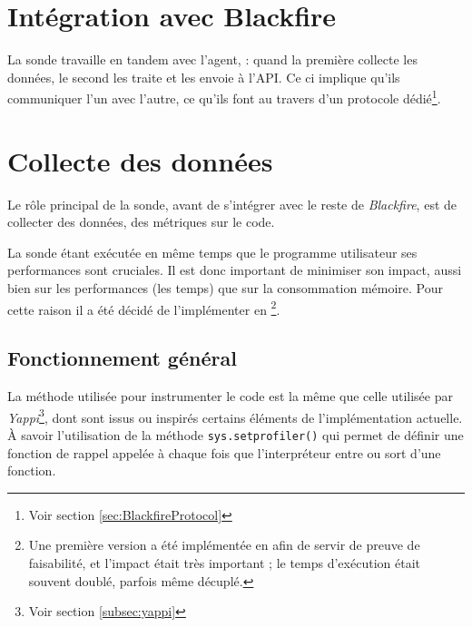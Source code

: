 
  \chapter[Intégration]{Intégration avec Blackfire}
  \label{chap:integration}
La sonde travaille en tandem avec l'agent, : quand la première collecte les données, le second les traite et les envoie à l'API. Ce ci implique qu'ils communiquer l'un avec l'autre, ce qu'ils font au travers d'un protocole dédié\footnote{Voir section \vref{sec:BlackfireProtocol}}.


  
  \chapter[Collecte]{Collecte des données}
Le rôle principal de la sonde, avant de s'intégrer avec le reste de \emph{Blackfire}, est de collecter des données, des métriques sur le code.

La sonde étant exécutée en même temps que le programme utilisateur ses performances sont cruciales. Il est donc important de minimiser son impact, aussi bien sur les performances (les temps) que sur la consommation mémoire. Pour cette raison il a été décidé de l'implémenter en \C\footnote{Une première version a été implémentée en \Python afin de servir de preuve de faisabilité, et l'impact était très important ; le temps d'exécution était souvent doublé, parfois même décuplé.}.

  \section{Fonctionnement général}
La méthode utilisée pour instrumenter le code \Python est la même que celle utilisée par \emph{Yappi}\footnote{Voir section \vref{subsec:yappi}}, dont sont issus ou inspirés certains éléments de l'implémentation actuelle. À savoir l'utilisation de la méthode \verb|sys.setprofiler()| qui permet de définir une fonction de rappel appelée à chaque fois que l'interpréteur entre ou sort d'une fonction.

